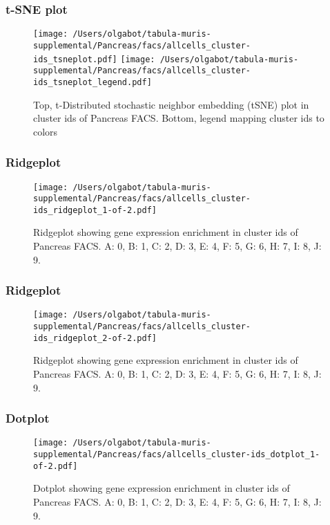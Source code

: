 \clearpage
\subsubsection{t-SNE plot}
\begin{figure}[h]
\centering
\texttt{[image: /Users/olgabot/tabula-muris-supplemental/Pancreas/facs/allcells\_cluster-ids\_tsneplot.pdf]}
\texttt{[image: /Users/olgabot/tabula-muris-supplemental/Pancreas/facs/allcells\_cluster-ids\_tsneplot\_legend.pdf]}
\caption{Top, t-Distributed stochastic neighbor embedding (tSNE) plot  in cluster ids of Pancreas FACS. Bottom, legend mapping cluster ids to colors}
\end{figure}


\clearpage
\clearpage
\subsubsection{Ridgeplot}
\begin{figure}[h]
\centering
\texttt{[image: /Users/olgabot/tabula-muris-supplemental/Pancreas/facs/allcells\_cluster-ids\_ridgeplot\_1-of-2.pdf]}

\caption{ Ridgeplot  showing gene expression enrichment in cluster ids of Pancreas FACS. A: 0, B: 1, C: 2, D: 3, E: 4, F: 5, G: 6, H: 7, I: 8, J: 9.}
\end{figure}


\clearpage
\clearpage
\subsubsection{Ridgeplot}
\begin{figure}[h]
\centering
\texttt{[image: /Users/olgabot/tabula-muris-supplemental/Pancreas/facs/allcells\_cluster-ids\_ridgeplot\_2-of-2.pdf]}

\caption{ Ridgeplot  showing gene expression enrichment in cluster ids of Pancreas FACS. A: 0, B: 1, C: 2, D: 3, E: 4, F: 5, G: 6, H: 7, I: 8, J: 9.}
\end{figure}


\clearpage
\clearpage
\subsubsection{Dotplot}
\begin{figure}[h]
\centering
\texttt{[image: /Users/olgabot/tabula-muris-supplemental/Pancreas/facs/allcells\_cluster-ids\_dotplot\_1-of-2.pdf]}

\caption{ Dotplot  showing gene expression enrichment in cluster ids of Pancreas FACS. A: 0, B: 1, C: 2, D: 3, E: 4, F: 5, G: 6, H: 7, I: 8, J: 9.}
\end{figure}


